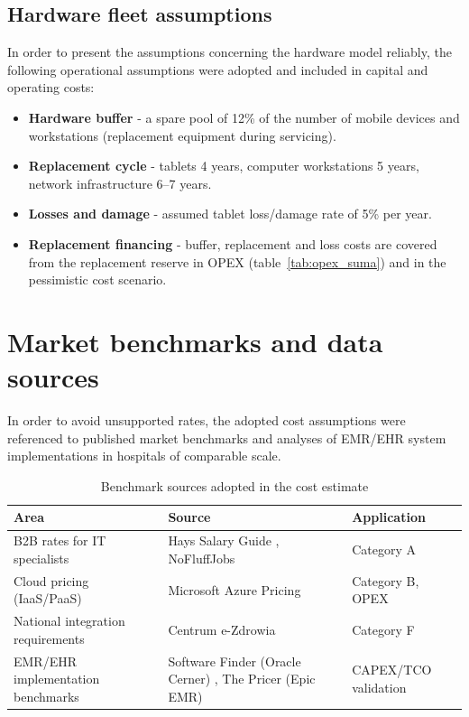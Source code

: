 \subsection{Hardware fleet assumptions}

In order to present the assumptions concerning the hardware model reliably, the following operational assumptions were adopted and included in capital and operating costs:

\begin{itemize}
    \item \textbf{Hardware buffer} - a spare pool of 12\% of the number of mobile devices and workstations (replacement equipment during servicing).
    \item \textbf{Replacement cycle} - tablets 4 years, computer workstations 5 years, network infrastructure 6--7 years.
    \item \textbf{Losses and damage} - assumed tablet loss/damage rate of 5\% per year.
    \item \textbf{Replacement financing} - buffer, replacement and loss costs are covered from the replacement reserve in OPEX (table~\ref{tab:opex_suma}) and in the pessimistic cost scenario.
\end{itemize}

\section{Market benchmarks and data sources}

In order to avoid unsupported rates, the adopted cost assumptions were referenced to published market benchmarks and analyses of EMR/EHR system implementations in hospitals of comparable scale.

\begin{table}[h]
\centering
\small
\renewcommand{\arraystretch}{1.2}
\begin{tabular}{|p{4.2cm}|p{5.8cm}|p{3.2cm}|}
\hline
\rowcolor{gray!20}\textbf{Area} & \textbf{Source} & \textbf{Application} \\
\hline
B2B rates for IT specialists & Hays Salary Guide \cite{Hays_2026}, NoFluffJobs \cite{NoFluffJobs_2025} & Category A \\
\hline
Cloud pricing (IaaS/PaaS) & Microsoft Azure Pricing \cite{Azure_Pricing_2026} & Category B, OPEX \\
\hline
National integration requirements & Centrum e-Zdrowia \cite{CeZ_P1_2025} & Category F \\
\hline
EMR/EHR implementation benchmarks & Software Finder (Oracle Cerner) \cite{SoftwareFinder_Cerner_2026}, The Pricer (Epic EMR) \cite{ThePricer_Epic_2024} & CAPEX/TCO validation \\
\hline
\end{tabular}
\caption{Benchmark sources adopted in the cost estimate}
\label{tab:benchmarki}
\end{table}

